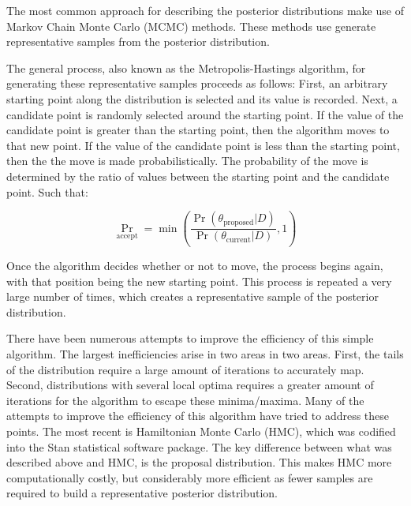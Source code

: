 
The most common approach for describing the posterior distributions make use of Markov Chain Monte Carlo (MCMC) methods. These methods use generate representative samples from the posterior distribution.


The general process, also known as the Metropolis-Hastings algorithm\cite{Metropolis1953}, for generating these representative samples proceeds as follows: First, an arbitrary starting point along the distribution is selected and its value is recorded. Next, a candidate point is randomly selected around the starting point. If the value of the candidate point is greater than the starting point, then the algorithm moves to that new point. If the value of the candidate point is less than the starting point, then the the move is made probabilistically. The probability of the move is determined by the ratio of values between the starting point and the candidate point. Such that:

$$ \Pr_{\text{accept}} = \min\left (\frac{\Pr(\theta_{\text{proposed}}|D)}{\Pr(\theta_{\text{current}}|D)} , 1 \right )$$

Once the algorithm decides whether or not to move, the process begins again, with that position being the new starting point. This process is repeated a very large number of times, which creates a representative sample of the posterior distribution.

There have been numerous attempts to improve the efficiency of this simple algorithm. The largest inefficiencies arise in two areas in two areas. First, the tails of the distribution require a large amount of iterations to accurately map. Second, distributions with several local optima requires a greater amount of iterations for the algorithm to escape these minima/maxima. Many of the attempts to improve the efficiency of this algorithm have tried to address these points. The most recent is Hamiltonian Monte Carlo (HMC), which was codified into the Stan statistical software package\cite{Carpenter2016}. The key difference between what was described above and HMC, is the proposal distribution\cite{Kruschke2015}. This makes HMC more computationally costly, but considerably more efficient as fewer samples are required to build a representative posterior distribution.

